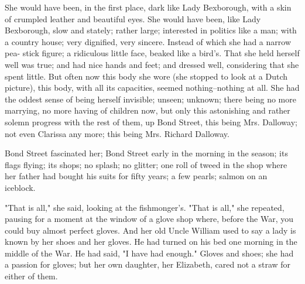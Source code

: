 \documentclass[lang=cn,10pt]{elegantbook}
\begin{document}
She would have been, in the first place, dark like Lady Bexborough,
with a skin of crumpled leather and beautiful eyes.  She would have
been, like Lady Bexborough, slow and stately; rather large;
interested in politics like a man; with a country house; very
dignified, very sincere.  Instead of which she had a narrow pea-
stick figure; a ridiculous little face, beaked like a bird's.  That
she held herself well was true; and had nice hands and feet; and
dressed well, considering that she spent little.  But often now
this body she wore (she stopped to look at a Dutch picture), this
body, with all its capacities, seemed nothing--nothing at all.  She
had the oddest sense of being herself invisible; unseen; unknown;
there being no more marrying, no more having of children now, but
only this astonishing and rather solemn progress with the rest of
them, up Bond Street, this being Mrs. Dalloway; not even Clarissa
any more; this being Mrs. Richard Dalloway.

Bond Street fascinated her; Bond Street early in the morning in the
season; its flags flying; its shops; no splash; no glitter; one
roll of tweed in the shop where her father had bought his suits for
fifty years; a few pearls; salmon on an iceblock.

"That is all," she said, looking at the fishmonger's.  "That is
all," she repeated, pausing for a moment at the window of a glove
shop where, before the War, you could buy almost perfect gloves.
And her old Uncle William used to say a lady is known by her shoes
and her gloves.  He had turned on his bed one morning in the middle
of the War.  He had said, "I have had enough."  Gloves and shoes;
she had a passion for gloves; but her own daughter, her Elizabeth,
cared not a straw for either of them.
\end{document}

